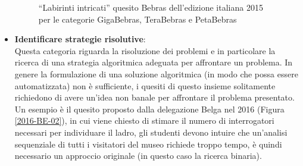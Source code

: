 \documentclass[12pt]{report}
\begin{document}
\begin{itemize}
	\begin{figure}[h]
		\centering
		\caption{``Labirinti intricati'' quesito Bebras dell'edizione italiana 2015 per le categorie GigaBebras, TeraBebras e PetaBebras}\label{labirinti}
	\end{figure}


\bigskip
	\item \textbf{Identificare strategie risolutive}:
	\\
	Questa categoria riguarda la risoluzione dei problemi e in particolare la ricerca di una strategia algoritmica adeguata per affrontare un problema. In genere la formulazione di una soluzione algoritmica (in modo che possa essere automatizzata) non è sufficiente, i quesiti di questo insieme solitamente richiedono di avere un'idea non banale per affrontare il problema presentato.
	Un esempio è il quesito proposto dalla delegazione Belga nel 2016 (Figura \ref{2016-BE-02}), in cui viene chiesto di stimare il numero di interrogatori necessari per individuare il ladro, gli studenti devono intuire che un'analisi sequenziale di tutti i visitatori del museo richiede troppo tempo, è quindi necessario un approccio originale (in questo caso la ricerca binaria). 
	

\end{itemize}
\end{document}
